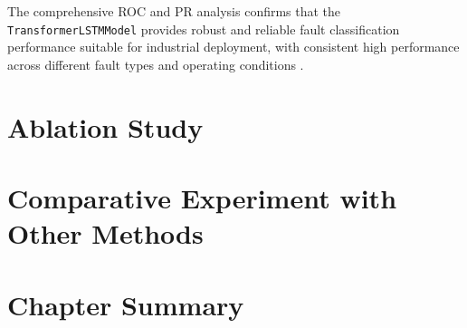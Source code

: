 The comprehensive ROC and PR analysis confirms that the \texttt{TransformerLSTMModel} provides robust and reliable fault classification performance suitable for industrial deployment, with consistent high performance across different fault types and operating conditions \citep{he2009learning, krawczyk2016learning}.

\section{Ablation Study}
\label{sec:experiments:ablation_study}

\section{Comparative Experiment with Other Methods}
\label{sec:experiments:comparative_experiment}

\section{Chapter Summary}
\label{sec:experiments:summary}
